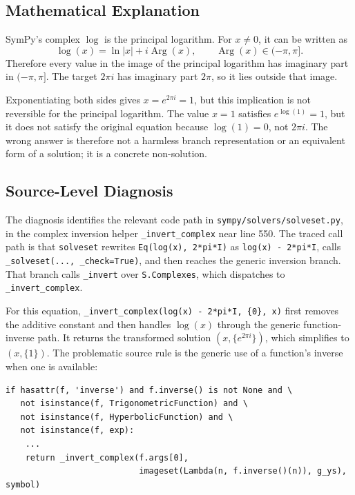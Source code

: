 \documentclass[11pt]{article}
\begin{document}
\subsection{Mathematical Explanation}

SymPy's complex \(\log\) is the principal logarithm.  For \(x\ne 0\), it can be
written as
\[
  \log(x) = \ln|x| + i\operatorname{Arg}(x),
  \qquad \operatorname{Arg}(x)\in(-\pi,\pi].
\]
Therefore every value in the image of the principal logarithm has imaginary
part in \((-\pi,\pi]\).  The target \(2\pi i\) has imaginary part \(2\pi\), so
it lies outside that image.

Exponentiating both sides gives \(x=e^{2\pi i}=1\), but this implication is not
reversible for the principal logarithm.  The value \(x=1\) satisfies
\(e^{\log(1)}=1\), but it does not satisfy the original equation because
\(\log(1)=0\), not \(2\pi i\).  The wrong answer is therefore not a harmless
branch representation or an equivalent form of a solution; it is a concrete
non-solution.

\subsection{Source-Level Diagnosis}

The diagnosis identifies the relevant code path in
\nolinkurl{sympy/solvers/solveset.py}, in the complex inversion helper
\texttt{\_invert\_complex} near line 550.  The traced call path is that
\texttt{solveset} rewrites \texttt{Eq(log(x), 2*pi*I)} as
\texttt{log(x) - 2*pi*I}, calls \texttt{\_solveset(..., \_check=True)}, and then
reaches the generic inversion branch.  That branch calls \texttt{\_invert} over
\texttt{S.Complexes}, which dispatches to \texttt{\_invert\_complex}.

For this equation, \texttt{\_invert\_complex(log(x) - 2*pi*I, \{0\}, x)}
first removes the additive constant and then handles \(\log(x)\) through the
generic function-inverse path.  It returns the transformed solution
\((x,\{e^{2\pi i}\})\), which simplifies to \((x,\{1\})\).  The problematic
source rule is the generic use of a function's inverse when one is available:

\begin{lstlisting}[style=bugpython]
if hasattr(f, 'inverse') and f.inverse() is not None and \
   not isinstance(f, TrigonometricFunction) and \
   not isinstance(f, HyperbolicFunction) and \
   not isinstance(f, exp):
    ...
    return _invert_complex(f.args[0],
                           imageset(Lambda(n, f.inverse()(n)), g_ys), symbol)
\end{lstlisting}
\end{document}
